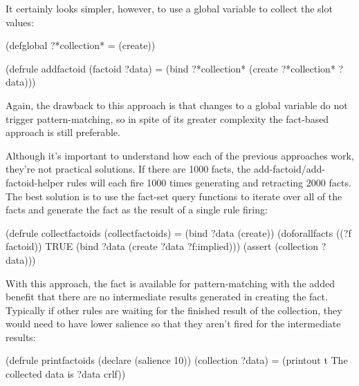 \documentclass[letterpaper,10pt,english]{sphinxmanual}
\begin{document}
It certainly looks simpler, however, to use a global variable to collect
the slot values:

\begin{sphinxVerbatim}[commandchars=\\\{\}]
(defglobal ?*collection* = (create\PYGZdl{}))

(defrule add\PYGZhy{}factoid
  (factoid ?data)
  =\PYGZgt{}
  (bind ?*collection* (create\PYGZdl{} ?*collection* ?data)))
\end{sphinxVerbatim}

Again, the drawback to this approach is that changes to a global
variable do not trigger pattern-matching, so in spite of its greater
complexity the fact-based approach is still preferable.

Although it’s important to understand how each of the previous
approaches work, they’re not practical solutions. If there are 1000
 facts, the add-factoid/add-factoid-helper rules will each fire
1000 times generating and retracting 2000 facts. The best solution is to
use the fact-set query functions to iterate over all of the 
facts and generate the  fact as the result of a single rule
firing:

\begin{sphinxVerbatim}[commandchars=\\\{\}]
(defrule collect\PYGZhy{}factoids
  (collect\PYGZhy{}factoids)
  =\PYGZgt{}
  (bind ?data (create\PYGZdl{}))
  (do\PYGZhy{}for\PYGZhy{}all\PYGZhy{}facts ((?f factoid)) TRUE
  (bind ?data (create\PYGZdl{} ?data ?f:implied)))
  (assert (collection ?data)))
\end{sphinxVerbatim}

With this approach, the  fact is available for
pattern-matching with the added benefit that there are no intermediate
results generated in creating the fact. Typically if other rules are
waiting for the finished result of the collection, they would need to
have lower salience so that they aren’t fired for the intermediate
results:

\begin{sphinxVerbatim}[commandchars=\\\{\}]
(defrule print\PYGZhy{}factoids
  (declare (salience \PYGZhy{}10))
  (collection \PYGZdl{}?data)
  =\PYGZgt{}
  (printout t \PYGZdq{}The collected data is \PYGZdq{} ?data crlf))
\end{sphinxVerbatim}
\end{document}
